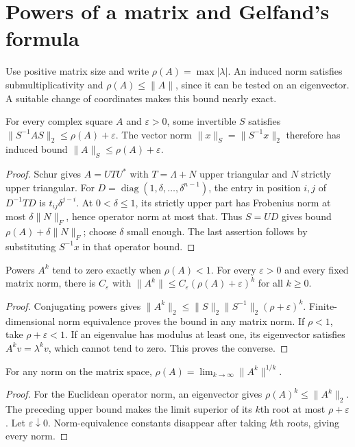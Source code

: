 \section{Powers of a matrix and Gelfand's formula}

Use positive matrix size and write $\rho(A)=\max|\lambda|$. An induced norm satisfies submultiplicativity and $\rho(A)\le\|A\|$, since it can be tested on an eigenvector. A suitable change of coordinates makes this bound nearly exact.

\begin{lemma}\label{linear:lem:adaptednorm}
For every complex square $A$ and $\varepsilon>0$, some invertible $S$ satisfies $\|S^{-1}AS\|_2\le\rho(A)+\varepsilon$. The vector norm $\|x\|_S=\|S^{-1}x\|_2$ therefore has induced bound $\|A\|_S\le\rho(A)+\varepsilon$.
\end{lemma}
\begin{proof}
Schur gives $A=UTU^*$ with $T=\Lambda+N$ upper triangular and $N$ strictly upper triangular. For $D=\operatorname{diag}(1,\delta,\ldots,\delta^{n-1})$, the entry in position $i,j$ of $D^{-1}TD$ is $t_{ij}\delta^{j-i}$. At $0<\delta\le1$, its strictly upper part has Frobenius norm at most $\delta\|N\|_F$, hence operator norm at most that. Thus $S=UD$ gives bound $\rho(A)+\delta\|N\|_F$; choose $\delta$ small enough. The last assertion follows by substituting $S^{-1}x$ in that operator bound.
\end{proof}

\begin{theorem}\label{linear:thm:powers}
Powers $A^k$ tend to zero exactly when $\rho(A)<1$. For every $\varepsilon>0$ and every fixed matrix norm, there is $C_\varepsilon$ with $\|A^k\|\le C_\varepsilon(\rho(A)+\varepsilon)^k$ for all $k\ge0$.
\end{theorem}
\begin{proof}
Conjugating powers gives $\|A^k\|_2\le\|S\|_2\|S^{-1}\|_2(\rho+\varepsilon)^k$. Finite-dimensional norm equivalence proves the bound in any matrix norm. If $\rho<1$, take $\rho+\varepsilon<1$. If an eigenvalue has modulus at least one, its eigenvector satisfies $A^kv=\lambda^kv$, which cannot tend to zero. This proves the converse.
\end{proof}

\begin{theorem}\label{linear:thm:gelfand}
For any norm on the matrix space, $\rho(A)=\lim_{k\to\infty}\|A^k\|^{1/k}$.
\end{theorem}
\begin{proof}
For the Euclidean operator norm, an eigenvector gives $\rho(A)^k\le\|A^k\|_2$. The preceding upper bound makes the limit superior of its $k$th root at most $\rho+\varepsilon$. Let $\varepsilon\downarrow0$. Norm-equivalence constants disappear after taking $k$th roots, giving every norm.
\end{proof}

